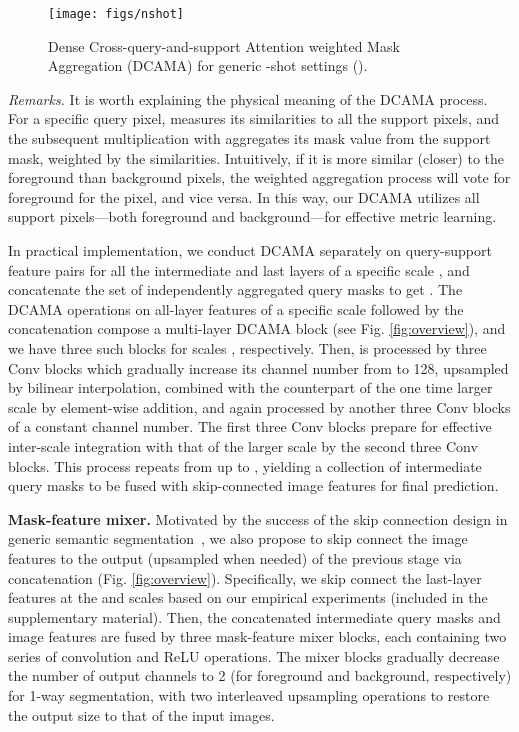 \documentclass[runningheads,table,xcdraw]{llncs}
\begin{document}
\begin{figure}[t]
  \centering
   \texttt{[image: figs/nshot]}
   \caption{Dense Cross-query-and-support Attention weighted Mask Aggregation (DCAMA) for generic -shot settings ().}\label{fig:nshot}
\end{figure}

\textit{Remarks.}
It is worth explaining the physical meaning of the DCAMA process.
For a specific query pixel,  measures its similarities to all the support pixels, and the subsequent multiplication with  aggregates its mask value from the support mask, weighted by the similarities.
Intuitively, if it is more similar (closer) to the foreground than background pixels, the weighted aggregation process will vote for foreground for the pixel, and vice versa.
In this way, our DCAMA utilizes all support pixels---both foreground and background---for effective metric learning.

In practical implementation, we conduct DCAMA separately on query-support feature pairs  for all the intermediate and last layers of a specific scale , and concatenate the set of independently aggregated query masks to get .
The DCAMA operations on all-layer features of a specific scale followed by the concatenation compose a multi-layer DCAMA block (see Fig. \ref{fig:overview}), and we have three such blocks for scales , respectively.
Then,  is processed by three Conv blocks which gradually increase its channel number from  to 128, upsampled by bilinear interpolation, combined with the counterpart of the one time larger scale by element-wise addition, and again processed by another three Conv blocks of a constant channel number.
The first three Conv blocks prepare  for effective inter-scale integration with that of the larger scale by the second three Conv blocks.
This process repeats from  up to , yielding a collection of intermediate query masks to be fused with skip-connected image features for final prediction.

\textbf{Mask-feature mixer.}
Motivated by the success of the skip connection design in generic semantic segmentation~\cite{ronneberger2015u,zhao2017pyramid}, we also propose to skip connect the image features to the output (upsampled when needed) of the previous stage via concatenation (Fig. \ref{fig:overview}).
Specifically, we skip connect the last-layer features at the  and  scales based on our empirical experiments (included in the supplementary material).
Then, the concatenated intermediate query masks and image features are fused by three mask-feature mixer blocks, each containing two series of convolution and ReLU operations.
The mixer blocks gradually decrease the number of output channels to 2 (for foreground and background, respectively) for 1-way segmentation, with two interleaved upsampling operations to restore the output size to that of the input images.
\end{document}
